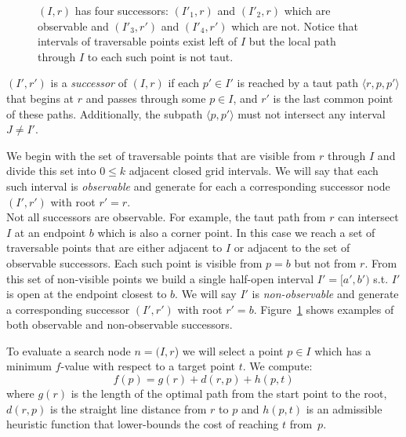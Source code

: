\begin{figure}[tb]
  \begin{center}
    
  \end{center}
  \caption{$(I, r)$ has four successors: $(I'_1, r)$ and $(I'_2,r)$ which are observable and $(I'_3, r')$ and $(I'_4, r')$ which are not. Notice that intervals of traversable points exist left of $I$ but the local path through $I$ to each such point is not taut.}
\label{fig::successors}
\end{figure}

\begin{defi}
\label{defi::successors}
$(I', r')$ is a \emph{successor} of
$(I, r)$ if each $p' \in I'$ is reached
by a taut path $\langle r, p,  p' \rangle$ that begins
at $r$ and passes through some $p \in I$, 
and $r'$ is the last common point of these paths.  Additionally, 
the subpath $\langle p, p' \rangle$ must not intersect any 
interval $J \neq I'$.
\end{defi}
We begin with the set of traversable points that are 
visible from $r$ through $I$ and divide this set into $0 \leq k$
adjacent closed grid intervals.
We will say that each such interval is \emph{observable} and 
generate for each a corresponding successor node 
$(I', r')$ with root $r' = r$.
\\
Not all successors are observable.
For example, the taut path from $r$ can intersect 
$I$ at an endpoint $b$ which is also a corner point.
In this case we reach a set of traversable points that 
are either adjacent to $I$ or adjacent to the set of 
observable successors.
Each such point is visible from $p = b$ but not 
from $r$.  From this set of non-visible points we build a 
single half-open interval $I' = [a', b')$ s.t. $I'$ is open at the 
endpoint closest to $b$.
We will say $I'$ is \emph{non-observable} and generate a 
corresponding successor $(I', r')$ with root $r' = b$.  
Figure~\ref{fig::successors} shows examples of both
observable and non-observable successors.
%

To evaluate a search node $n = (I, r$) we will select a point $p \in I$ 
which has a minimum $f$-value with respect to a target point $t$.
We compute: 
\begin{equation}
\label{eq::f}
f(p) = g(r) + d(r, p) + h(p, t)
\end{equation}
where $g(r)$ is the length of the optimal path from the start point to 
the root, $d(r, p)$ is the straight line distance from $r$ to $p$
and $h(p, t)$ is an admissible heuristic function that lower-bounds the cost of reaching $t$ from~$p$.  

